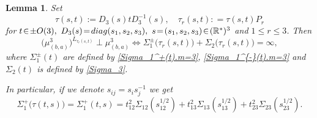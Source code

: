 \documentclass[preprint,12pt]{elsarticle}
\newtheorem{lem}[thm]{Lemma}
\numberwithin{equation}{section}
\begin{document}
\begin{lem}
\label{l.O(3).perp}
%
Set  
$$\tau(s,t):=D_3(s)tD_3^{-1}(s),\quad \tau_r(s,t):
=\tau(s,t)P_r
$$
for $t\!\in\! \pm {\rm O}(3),\,\,D_3(s)\!=\! {\rm diag}(s_1,s_2,s_3),\,\,s\!=\!(s_1,s_2,s_3)\!\in\! (\mathbb R^*)^3$ 
and $1\leq r\leq 3$. Then 
\begin{equation}
 \label{O(3).perp}
 \big(\mu_{(b,a)}^3\big)^{L_{\tau_r(s,t)}}\perp \mu_{(b,a)}^3\Leftrightarrow
\Sigma_1^\pm\big(\tau_r(s,t)\big)
+\Sigma_2\big(
\tau_r(s,t)\big)
=\infty, 
\end{equation}
%
where $\Sigma_1^\pm(t)$
are defined by \eqref{Sigma_1^+(t).m=3},\,\,\eqref{Sigma_1^{-}(t).m=3} and 
$\Sigma_2(t)$ is defined by \eqref{Sigma_3}.

In particular, if we denote $ s_{ij}=s_is_j^{-1}$ we get
\begin{equation}
\label{Sigma-123(T)}
\Sigma_{1}^+\big(\tau(t,s)\big)=\Sigma_{1}^+(t,s)=
t^2_{12}\Sigma_{12}(s_{12}^{1/2})+
t^2_{13}\Sigma_{13}(s_{13}^{1/2})+
t^2_{23}\Sigma_{23}(s_{23}^{1/2}).
\end{equation}
\end{lem} 
%
\end{document}
